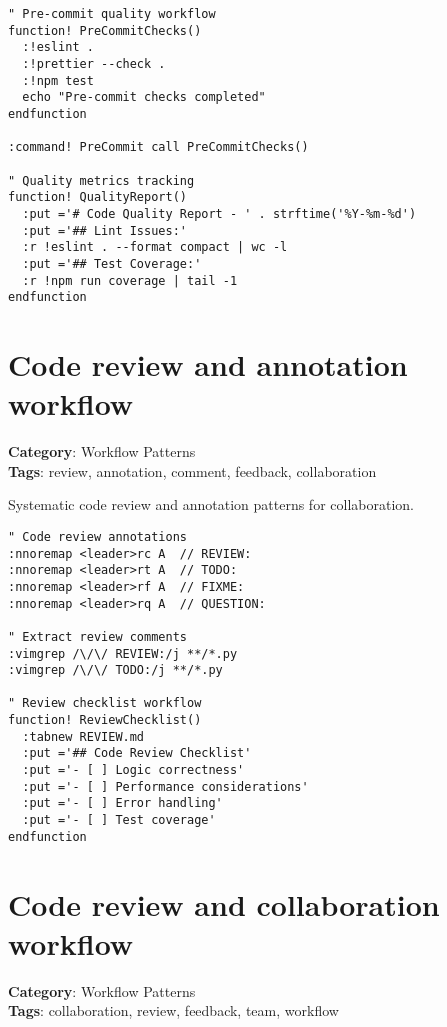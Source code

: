 {{{{{{{{{{{{{{{{{{\begin{Exa*}{}
\begin{Verbatim}[fontsize=\footnotesize, breaklines, breakanywhere]
" Pre-commit quality workflow
function! PreCommitChecks()
  :!eslint .
  :!prettier --check .
  :!npm test
  echo "Pre-commit checks completed"
endfunction

:command! PreCommit call PreCommitChecks()

" Quality metrics tracking
function! QualityReport()
  :put ='# Code Quality Report - ' . strftime('%Y-%m-%d')
  :put ='## Lint Issues:'
  :r !eslint . --format compact | wc -l
  :put ='## Test Coverage:'
  :r !npm run coverage | tail -1
endfunction
\end{Verbatim}
\end{Exa*}

\section{Code review and annotation workflow}

\textbf{Category}: Workflow Patterns\\ \textbf{Tags}: review, annotation, comment, feedback, collaboration
\vspace{0.5cm}

Systematic code review and annotation patterns for collaboration.

\begin{Exa*}{}
\begin{Verbatim}[fontsize=\footnotesize, breaklines, breakanywhere]
" Code review annotations
:nnoremap <leader>rc A  // REVIEW: 
:nnoremap <leader>rt A  // TODO: 
:nnoremap <leader>rf A  // FIXME: 
:nnoremap <leader>rq A  // QUESTION: 

" Extract review comments
:vimgrep /\/\/ REVIEW:/j **/*.py
:vimgrep /\/\/ TODO:/j **/*.py

" Review checklist workflow
function! ReviewChecklist()
  :tabnew REVIEW.md
  :put ='## Code Review Checklist'
  :put ='- [ ] Logic correctness'
  :put ='- [ ] Performance considerations'
  :put ='- [ ] Error handling'
  :put ='- [ ] Test coverage'
endfunction
\end{Verbatim}
\end{Exa*}

\section{Code review and collaboration workflow}

\textbf{Category}: Workflow Patterns\\ \textbf{Tags}: collaboration, review, feedback, team, workflow
\vspace{0.5cm}

}}}}}}}}}}}}}}}}}}
